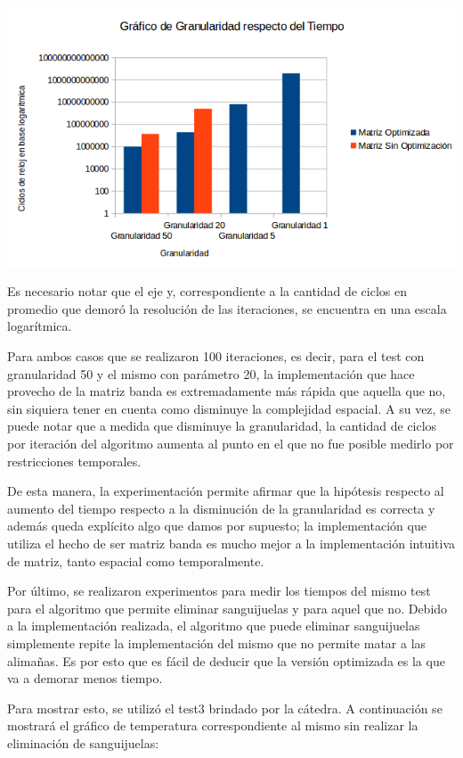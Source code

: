 	\begin{center}
		\includegraphics[scale=0.7]{./img/granularidad/granularidadrespectotiempo.png}
	\end{center}
	
	\par 
	Es necesario notar que el eje y, correspondiente a la cantidad de ciclos en promedio que demoró la resolución de las iteraciones, se encuentra en una escala logarítmica. 
	\par 
	Para ambos casos que se realizaron 100 iteraciones, es decir, para el test con granularidad 50 y el mismo con parámetro 20, la implementación que hace provecho de la matriz banda es extremadamente más rápida que aquella que no, sin siquiera tener en cuenta como disminuye la complejidad espacial. A su vez, se puede notar que a medida que disminuye la granularidad, la cantidad de ciclos por iteración del algoritmo aumenta al punto en el que no fue posible medirlo por restricciones temporales. 
	\par 
	De esta manera, la experimentación permite afirmar que la hipótesis respecto al aumento del tiempo respecto a la disminución de la granularidad es correcta y además queda explícito algo que damos por supuesto; la implementación que utiliza el hecho de ser matriz banda es mucho mejor a la implementación intuitiva de matriz, tanto espacial como temporalmente.
	
	\par 
	
	Por último, se realizaron experimentos para medir los tiempos del mismo test para el algoritmo que permite eliminar sanguijuelas y para aquel que no. 
	Debido a la implementación realizada, el algoritmo que puede eliminar sanguijuelas simplemente repite la implementación del mismo que no permite matar a las alimañas. Es por esto que es fácil de deducir que la versión optimizada es la que va a demorar menos tiempo. 
	\par 
	Para mostrar esto, se utilizó el test3 brindado por la cátedra. A continuación se mostrará el gráfico de temperatura correspondiente al mismo sin realizar la eliminación de sanguijuelas:
	
